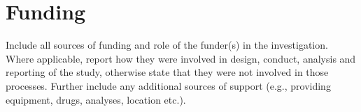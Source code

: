 \section*{Funding}

\begin{prereg}
\begin{instruction}
Include all sources of funding and role of the funder(s) in the investigation. Where applicable, report how they were involved in design, conduct, analysis and reporting of the study, otherwise state that they were not involved in those processes. Further include any additional sources of support (e.g., providing equipment, drugs, analyses, location etc.).
\end{instruction}
\end{prereg}
